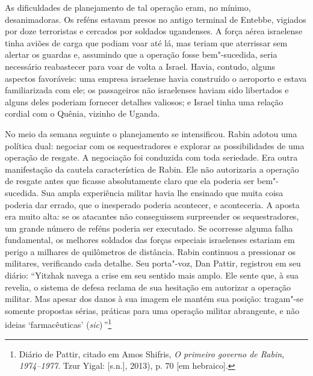 As dificuldades de planejamento de tal operação eram, no mínimo,
desanimadoras. Os reféns estavam presos no antigo terminal de Entebbe,
vigiados por doze terroristas e cercados por soldados ugandenses. A
força aérea israelense tinha aviões de carga que podiam voar até lá, mas
teriam que aterrissar sem alertar os guardas e, assumindo que a operação
fosse bem"-sucedida, seria necessário reabastecer para voar de volta a
Israel. Havia, contudo, alguns aspectos favoráveis: uma empresa
israelense havia construído o aeroporto e estava familiarizada com ele;
os passageiros não israelenses haviam sido libertados e alguns deles
poderiam fornecer detalhes valiosos; e Israel tinha uma relação cordial
com o Quênia, vizinho de Uganda.

No meio da semana seguinte o planejamento se intensificou. Rabin adotou
uma política dual: negociar com os sequestradores e explorar as
possibilidades de uma operação de resgate. A negociação foi conduzida
com toda seriedade. Era outra manifestação da cautela característica de
Rabin. Ele não autorizaria a operação de resgate antes que ficasse
absolutamente claro que ela poderia ser bem"-sucedida. Sua ampla
experiência militar havia lhe ensinado que muita coisa poderia dar
errado, que o inesperado poderia acontecer, e aconteceria. A aposta era
muito alta: se os atacantes não conseguissem surpreender os
sequestradores, um grande número de reféns poderia ser executado. Se
ocorresse alguma falha fundamental, os melhores soldados das forças
especiais israelenses estariam em perigo a milhares de quilômetros de
distância. Rabin continuou a pressionar os militares, verificando cada
detalhe. Seu porta"-voz, Dan Pattir, registrou em seu diário: ``Yitzhak
navega a crise em seu sentido mais amplo. Ele sente que, à sua revelia,
o sistema de defesa reclama de sua hesitação em autorizar a operação
militar. Mas apesar dos danos à sua imagem ele mantém sua posição:
tragam"-se somente propostas sérias, práticas para uma operação militar
abrangente, e não ideias `farmacêuticas' (\textit{sic})\,''\footnote{Diário de Pattir, citado em Amos Shifris, \textit{O primeiro governo de Rabin, 1974--1977}.
Tzur Yigal: {[}s.n.{]}, 2013), p. 70 {[}em hebraico{]}.}

